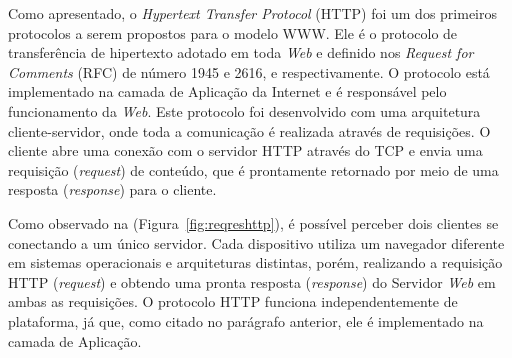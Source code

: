 Como apresentado, o \textit{Hypertext Transfer Protocol} (HTTP) foi um dos primeiros protocolos a serem propostos para o modelo WWW. Ele é o protocolo de transferência de hipertexto adotado em toda \textit{Web} e definido nos \textit{Request for Comments} (RFC) de número 1945 e 2616, \cite{rfc1945} e \cite{rfc2616} respectivamente. O protocolo está implementado na camada de Aplicação da Internet e é responsável pelo funcionamento da \textit{Web}. Este protocolo foi desenvolvido com uma arquitetura cliente-servidor, onde toda a comunicação é realizada através de requisições. O cliente abre uma conexão com o servidor HTTP através do TCP e envia uma requisição (\textit{request}) de conteúdo, que é prontamente retornado por meio de uma resposta (\textit{response}) para o cliente.

\begin{figure}[th]
\end{figure}

Como observado na (Figura~\ref{fig:reqreshttp}), é possível perceber dois clientes se conectando a um único servidor. Cada dispositivo utiliza um navegador diferente em sistemas operacionais e arquiteturas distintas, porém, realizando a requisição HTTP (\textit{request}) e obtendo uma pronta resposta (\textit{response}) do Servidor \textit{Web} em ambas as requisições. O protocolo HTTP funciona independentemente de plataforma, já que, como citado no parágrafo anterior, ele é implementado na camada de Aplicação.

